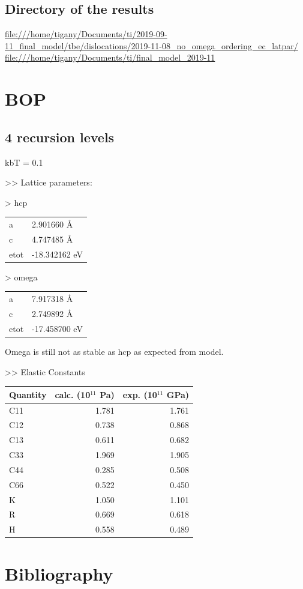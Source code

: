 \documentclass[11pt]{article}
\begin{document}
\subsection{Directory of the results}
\label{sec:orgde5014f}
\url{file:///home/tigany/Documents/ti/2019-09-11\_final\_model/tbe/dislocations/2019-11-08\_no\_omega\_ordering\_ec\_latpar/}
\url{file:///home/tigany/Documents/ti/final\_model\_2019-11}

\section{BOP}
\label{sec:org4fa19fa}

\subsection{4 recursion levels}
\label{sec:org4ba23d1}

kbT = 0.1

>> Lattice parameters:

> hcp
\begin{center}
\begin{tabular}{ll}
a & 2.901660  \AA{}\\
c & 4.747485  \AA{}\\
etot & -18.342162  eV\\
\end{tabular}
\end{center}

> omega
\begin{center}
\begin{tabular}{ll}
a & 7.917318  \AA{}\\
c & 2.749892 \AA{}\\
etot & -17.458700 eV\\
\end{tabular}
\end{center}

Omega is still not as stable as hcp as expected from model. 


>> Elastic Constants

\begin{center}
\begin{tabular}{lrr}
Quantity & calc. (10\(^{\text{11}}\) Pa) & exp. (10\(^{\text{11}}\) GPa)\\
\hline
C11 & 1.781 & 1.761\\
C12 & 0.738 & 0.868\\
C13 & 0.611 & 0.682\\
C33 & 1.969 & 1.905\\
C44 & 0.285 & 0.508\\
C66 & 0.522 & 0.450\\
K & 1.050 & 1.101\\
R & 0.669 & 0.618\\
H & 0.558 & 0.489\\
\end{tabular}
\end{center}

\section{Bibliography}
\label{sec:org9beaf5f}
\label{org842ba38}



\end{document}
